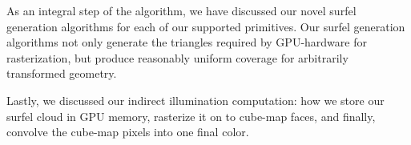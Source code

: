 As an integral step of the algorithm, we have discussed our novel surfel generation algorithms for each of our supported primitives. Our surfel generation algorithms not only generate the triangles required by GPU-hardware for rasterization, but produce reasonably uniform coverage for arbitrarily transformed geometry.

Lastly, we discussed our indirect illumination computation: how we store our surfel cloud in GPU memory, rasterize it on to cube-map faces, and finally, convolve the cube-map pixels into one final color.
